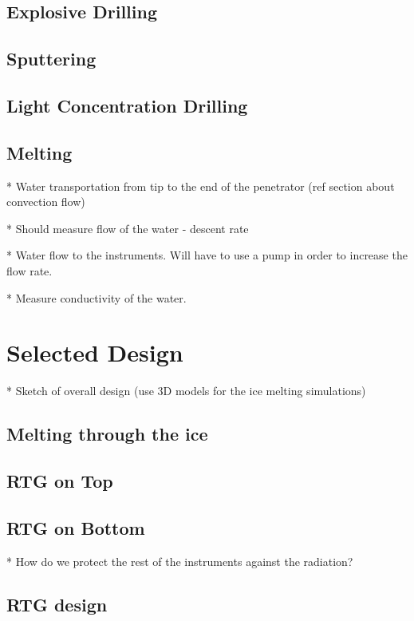 \subsection{Explosive Drilling}

\subsection{Sputtering}



\subsection{Light Concentration Drilling}

\subsection{Melting}

* Water transportation from tip to the end of the penetrator (ref section about convection flow)

* Should measure flow of the water - descent rate

* Water flow to the instruments. Will have to use a pump in order to increase the flow rate.

* Measure conductivity of the water.

\section{Selected Design}

* Sketch of overall design (use 3D models for the ice melting simulations)

\subsection{Melting through the ice} %

\subsection{RTG on Top}

\subsection{RTG on Bottom}

* How do we protect the rest of the instruments against the radiation?

\subsection{RTG design}


